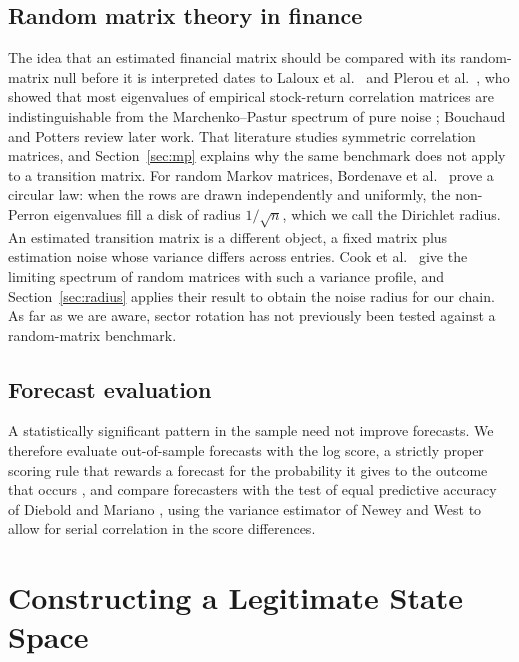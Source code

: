 \documentclass[11pt]{article}
\begin{document}
\subsection{Random matrix theory in finance}

The idea that an estimated financial matrix should be compared with its random-matrix null before it is interpreted dates to Laloux et al.\ \cite{lalouxetal1999} and Plerou et al.\ \cite{plerouetal2000}, who showed that most eigenvalues of empirical stock-return correlation matrices are indistinguishable from the Marchenko--Pastur spectrum of pure noise \cite{marchenkopastur1967}; Bouchaud and Potters \cite{bouchaudpotters2009} review later work. That literature studies symmetric correlation matrices, and Section~\ref{sec:mp} explains why the same benchmark does not apply to a transition matrix. For random Markov matrices, Bordenave et al.\ \cite{bordenave2012} prove a circular law: when the rows are drawn independently and uniformly, the non-Perron eigenvalues fill a disk of radius $1/\sqrt n$, which we call the Dirichlet radius. An estimated transition matrix is a different object, a fixed matrix plus estimation noise whose variance differs across entries. Cook et al.\ \cite{cooketal2018} give the limiting spectrum of random matrices with such a variance profile, and Section~\ref{sec:radius} applies their result to obtain the noise radius for our chain. As far as we are aware, sector rotation has not previously been tested against a random-matrix benchmark.

\subsection{Forecast evaluation}

A statistically significant pattern in the sample need not improve forecasts. We therefore evaluate out-of-sample forecasts with the log score, a strictly proper scoring rule that rewards a forecast for the probability it gives to the outcome that occurs \cite{gneitingraftery2007}, and compare forecasters with the test of equal predictive accuracy of Diebold and Mariano \cite{dieboldmariano1995}, using the variance estimator of Newey and West \cite{neweywest1987} to allow for serial correlation in the score differences.

\clearpage
\section{Constructing a Legitimate State Space}
\label{sec:state}
\end{document}
